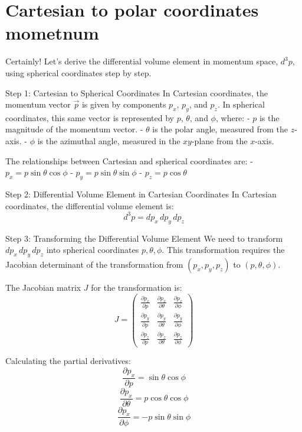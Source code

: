 \graphicspath{{/home/maurizio/Documents/GitHub/computational-biophysics-theory/pathria/images/}}

\section{Cartesian to polar coordinates mometnum}

Certainly! Let's derive the differential volume element in momentum space, \(d^3p\), using spherical coordinates step by step.

Step 1: Cartesian to Spherical Coordinates
In Cartesian coordinates, the momentum vector \(\vec{p}\) is given by components \(p_x\), \(p_y\), and \(p_z\). In spherical coordinates, this same vector is represented by \(p\), \(\theta\), and \(\phi\), where:
- \( p \) is the magnitude of the momentum vector.
- \(\theta\) is the polar angle, measured from the \(z\)-axis.
- \(\phi\) is the azimuthal angle, measured in the \(xy\)-plane from the \(x\)-axis.

The relationships between Cartesian and spherical coordinates are:
- \( p_x = p \sin\theta \cos\phi \)
- \( p_y = p \sin\theta \sin\phi \)
- \( p_z = p \cos\theta \)

Step 2: Differential Volume Element in Cartesian Coordinates
In Cartesian coordinates, the differential volume element is:
\[ d^3p = dp_x \, dp_y \, dp_z \]

Step 3: Transforming the Differential Volume Element
We need to transform \(dp_x \, dp_y \, dp_z\) into spherical coordinates \(p, \theta, \phi\). This transformation requires the Jacobian determinant of the transformation from \((p_x, p_y, p_z)\) to \((p, \theta, \phi)\).

The Jacobian matrix \(J\) for the transformation is:
\[ J = \begin{pmatrix}
\frac{\partial p_x}{\partial p} & \frac{\partial p_x}{\partial \theta} & \frac{\partial p_x}{\partial \phi} \\
\frac{\partial p_y}{\partial p} & \frac{\partial p_y}{\partial \theta} & \frac{\partial p_y}{\partial \phi} \\
\frac{\partial p_z}{\partial p} & \frac{\partial p_z}{\partial \theta} & \frac{\partial p_z}{\partial \phi}
\end{pmatrix} \]

Calculating the partial derivatives:
\[ \frac{\partial p_x}{\partial p} = \sin\theta \cos\phi \]
\[ \frac{\partial p_x}{\partial \theta} = p \cos\theta \cos\phi \]
\[ \frac{\partial p_x}{\partial \phi} = -p \sin\theta \sin\phi \]


